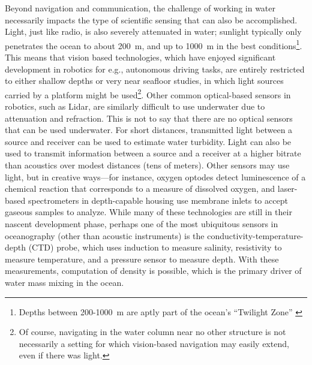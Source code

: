 Beyond navigation and communication, the challenge of working in water necessarily impacts the type of scientific sensing that can also be accomplished. Light, just like radio, is also severely attenuated in water; sunlight typically only penetrates the ocean to about \SI{200}{\meter}, and up to \SI{1000}{\meter} in the best conditions\footnote{Depths between 200-\SI{1000}{\meter} are aptly part of the ocean's ``Twilight Zone'' \autocite{martin2020oceans}}. This means that vision based technologies, which have enjoyed significant development in robotics for e.g., autonomous driving tasks, are entirely restricted to either shallow depths or very near seafloor studies, in which light sources carried by a platform might be used\footnote{Of course, navigating in the water column near no other structure is not necessarily a setting for which vision-based navigation may easily extend, even if there was light.}. Other common optical-based sensors in robotics, such as Lidar, are similarly difficult to use underwater due to attenuation and refraction. This is not to say that there are no optical sensors that can be used underwater. For short distances, transmitted light between a source and receiver can be used to estimate water turbidity\autocite{bishop1999transmissometer}. Light can also be used to transmit information between a source and a receiver at a higher bitrate than acoustics over modest distances (tens of meters)\autocite{qureshi2016rf,farr2010integrated}. Other sensors may use light, but in creative ways---for instance, oxygen optodes detect luminescence of a chemical reaction that corresponds to a measure of dissolved oxygen\autocite{nicholson2017air}, and laser-based spectrometers in depth-capable housing use membrane inlets to accept gaseous samples to analyze\autocite{wankel2010new}. While many of these technologies are still in their nascent development phase, perhaps one of the most ubiquitous sensors in oceanography (other than acoustic instruments) is the conductivity-temperature-depth (CTD) probe, which uses induction to measure salinity, resistivity to measure temperature, and a pressure sensor to measure depth\autocite{rudnick2007underway}. With these measurements, computation of density is possible, which is the primary driver of water mass mixing in the ocean. 

